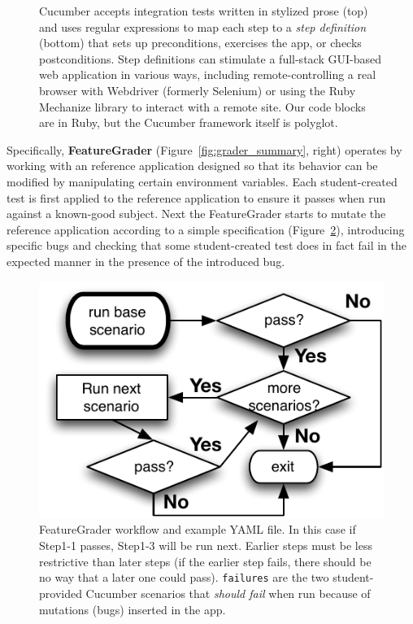 \begin{figure}
  \centering
    
  \caption{\label{fig:cucumber} Cucumber accepts integration tests 
    written in stylized prose (top) and uses regular expressions to map each
    step to a \emph{step definition} (bottom) that sets up preconditions, exercises the app,
    or checks postconditions.  Step definitions 
    can stimulate a full-stack GUI-based web application in various
    ways, including remote-controlling a real browser with Webdriver
    (formerly Selenium) or using the Ruby Mechanize library to interact
    with a remote site.  Our code blocks are in Ruby, but the Cucumber framework
itself is polyglot.} 
\end{figure}

Specifically, \textbf{FeatureGrader}  (Figure~\ref{fig:grader_summary},
right)
operates by working with an
reference application designed so that its behavior can be modified by
manipulating certain environment variables.
Each student-created test   is first applied to the reference
application to ensure it passes when run against a known-good subject.
Next the FeatureGrader starts to mutate the reference application
according to a simple specification (Figure~\ref{fig:featuregrader}), 
introducing specific bugs and checking that some student-created test
does in fact fail in the expected manner in the presence of the
introduced bug.  

\begin{figure}
  \begin{minipage}{0.45\textwidth}%
  \includegraphics[width=\textwidth]{figs/feature_grader.pdf}%
  \end{minipage}%
  \begin{minipage}{0.55\textwidth}%
  \end{minipage}
  \caption{\label{fig:featuregrader}%
FeatureGrader workflow and example YAML file.  In this case if Step1-1 passes,
Step1-3 will be run next.  Earlier steps must be less restrictive than
later steps (if the earlier step fails, there should be no way that a later one could pass).
\texttt{failures} are the two student-provided Cucumber scenarios that \emph{should fail} when
run because of mutations (bugs) inserted in the app.
}
\end{figure}

